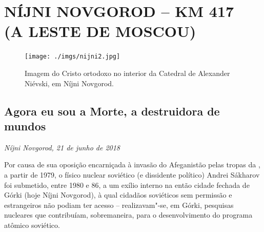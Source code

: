 


\makeatletter\@openrightfalse
\movetooddpage
\part*{NÍJNI NOVGOROD -- KM 417\\(A LESTE DE MOSCOU)}

\movetoevenpage
\begin{absolutelynopagebreak}
\begin{vplace}
\begin{figure}[H]
\begin{adjustwidth}{-1.8cm}{}
  \vspace{2.7cm}
  \texttt{[image: ./imgs/nijni2.jpg]}  
\end{adjustwidth}
  \caption{Imagem do Cristo ortodoxo no interior da Catedral de Alexander Niévski, em Níjni Novgorod.}

\thispagestyle{empty}

\end{figure}
\end{vplace}

\end{absolutelynopagebreak}

\chapter*{Agora eu sou a Morte, a destruidora de mundos}
\@openrighttrue\makeatother

\begin{flushright}
\emph{Níjni Novgorod, 21 de junho de 2018}
\end{flushright}

Por causa de sua oposição encarniçada à invasão do Afeganistão pelas
tropas da , a partir de 1979, o físico nuclear soviético (e
dissidente político) Andrei Sákharov foi submetido, entre 1980 e 86, a
um exílio interno na então cidade fechada de Górki (hoje Níjni
Novgorod), à qual cidadãos soviéticos sem permissão e estrangeiros não
podiam ter acesso -- realizavam"-se, em Górki, pesquisas nucleares que
contribuíam, sobremaneira, para o desenvolvimento do programa atômico
soviético.

